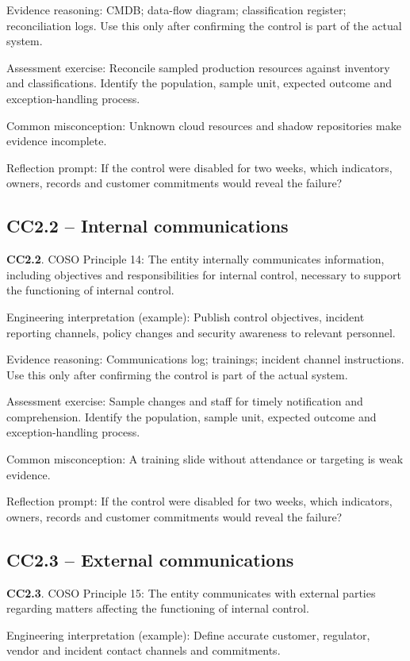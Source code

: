 \documentclass[10pt,oneside]{report}
\begin{document}
Evidence reasoning: CMDB; data-flow diagram; classification register; reconciliation logs. Use this only after confirming the control is part of the actual system.

Assessment exercise: Reconcile sampled production resources against inventory and classifications. Identify the population, sample unit, expected outcome and exception-handling process.

Common misconception: Unknown cloud resources and shadow repositories make evidence incomplete.

Reflection prompt: If the control were disabled for two weeks, which indicators, owners, records and customer commitments would reveal the failure?

\subsection{CC2.2 -- Internal communications}
\begin{aicpabox}
\textbf{CC2.2}. COSO Principle 14: The entity internally communicates information, including objectives and responsibilities for internal control, necessary to support the functioning of internal control.\par{}
\end{aicpabox}
Engineering interpretation (example): Publish control objectives, incident reporting channels, policy changes and security awareness to relevant personnel.

Evidence reasoning: Communications log; trainings; incident channel instructions. Use this only after confirming the control is part of the actual system.

Assessment exercise: Sample changes and staff for timely notification and comprehension. Identify the population, sample unit, expected outcome and exception-handling process.

Common misconception: A training slide without attendance or targeting is weak evidence.

Reflection prompt: If the control were disabled for two weeks, which indicators, owners, records and customer commitments would reveal the failure?

\subsection{CC2.3 -- External communications}
\begin{aicpabox}
\textbf{CC2.3}. COSO Principle 15: The entity communicates with external parties regarding matters affecting the functioning of internal control.\par{}
\end{aicpabox}
Engineering interpretation (example): Define accurate customer, regulator, vendor and incident contact channels and commitments.
\end{document}
